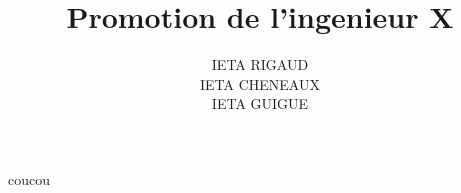 \documentclass[a4paper, 11pt, oneside]{article}
\begin{document}
\title{Promotion de l'ingenieur X}
\author{IETA RIGAUD\\ IETA CHENEAUX\\ IETA GUIGUE}
\date{} 
 
 
\tableofcontents

coucou
\end{document}
